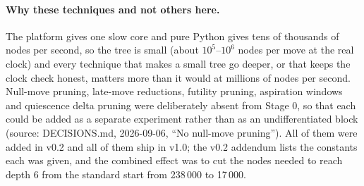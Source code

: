 \documentclass[11pt,a4paper]{article}
\newcommand{\src}[1]{{\small(source: #1)}}
\begin{document}
\paragraph{Why these techniques and not others here.} The platform gives one slow core and pure Python
gives tens of thousands of nodes per second, so the tree is small (about $10^5$--$10^6$ nodes per move at
the real clock) and every technique that makes a small tree go deeper, or that keeps the clock check
honest, matters more than it would at millions of nodes per second. Null-move pruning, late-move
reductions, futility pruning, aspiration windows and quiescence delta pruning were deliberately absent from
Stage 0, so that each could be added as a separate experiment rather than as an undifferentiated block
\src{DECISIONS.md, 2026-09-06, ``No null-move pruning''}. All of them were added in v0.2 and all of them
ship in v1.0; the v0.2 addendum lists the constants each was given, and the combined effect was to cut the
nodes needed to reach depth 6 from the standard start from 238\,000 to 17\,000.
\end{document}
